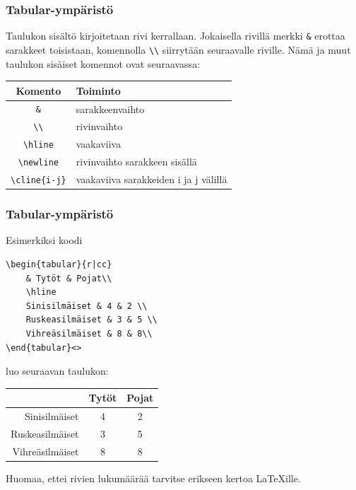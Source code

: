 \begin{fframe}
    \frametitle{Tabular-ympäristö}
    Taulukon sisältö kirjoitetaan rivi kerrallaan. Jokaisella rivillä merkki \lstinline-&- erottaa sarakkeet toisistaan, komennolla \lstinline-\\- siirrytään seuraavalle riville.  Nämä ja muut taulukon sisäiset komennot ovat seuraavassa:
    \vaihto
    \begin{table}
        \begin{small}
            \begin{tabular}{cl}
                Komento & Toiminto\\
                \hline
                \lstinline-&- & sarakkeenvaihto\\
                \hline
                \lstinline-\\- & rivinvaihto\\
                \hline
                \lstinline-\hline- & vaakaviiva \\
                \hline
                \lstinline-\newline- & rivinvaihto sarakkeen sisällä\\
                \hline
                \lstinline+\cline{i-j}+ & vaakaviiva sarakkeiden i ja j välillä\\
                \hline
            \end{tabular}
        \end{small}
    \end{table}
\end{fframe}

\begin{fframe}
    \frametitle{Tabular-ympäristö}
    Esimerkiksi koodi
    \begin{lstlisting}
\begin{tabular}{r|cc}
    & Tytöt & Pojat\\
    \hline
    Sinisilmäiset & 4 & 2 \\
    Ruskeasilmäiset & 3 & 5 \\
    Vihreäsilmäiset & 8 & 8\\
\end{tabular}<>
    \end{lstlisting}
    \pause
    luo seuraavan taulukon:
    \begin{sample} 
        \begin{small}
            \begin{tabular}{r|cc}
                & Tytöt & Pojat\\
                \hline
                Sinisilmäiset & 4 & 2 \\
                Ruskeasilmäiset & 3 & 5 \\
                Vihreäsilmäiset & 8 & 8\\
            \end{tabular}
        \end{small}
    \end{sample}
    Huomaa, ettei rivien lukumäärää tarvitse erikseen kertoa \LaTeX ille.
\end{fframe}

